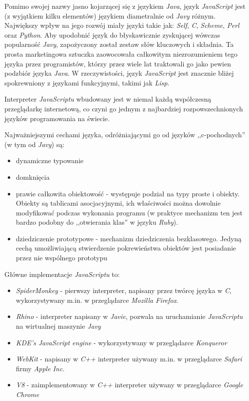\documentclass[a4paper,12pt]{article}
\begin{document}
Pomimo swojej nazwy jasno kojarzącej się z językiem \emph{Java}, język
\emph{JavaScript} jest (z wyjątkiem kilku elementów) językiem
diametralnie od \emph{Javy} różnym. Największy wpływ na jego rozwój
miały języki takie jak: \emph{Self}, \emph{C}, \emph{Scheme},
\emph{Perl} oraz \emph{Python}. Aby upodobnić język do błyskawicznie
zyskującej wówczas popularność \emph{Javy}, zapożyczony został zestaw
słów kluczowych i składnia. Ta prosta marketingowa sztuczka
zaowocowała całkowitym niezrozumieniem tego języka przez programistów,
którzy przez wiele lat traktowali go jako pewien podzbiór języka
\emph{Java}. W rzeczywistości, język \emph{JavaScript} jest znacznie
bliżej spokrewniony z językami funkcyjnymi, takimi jak \emph{Lisp}.

Interpreter \emph{JavaScriptu} wbudowany jest w niemal każdą
współczesną przeglądarkę internetową, co czyni go jednym z najbardziej
rozpowszechnionych języków programowania na świecie.

Najważniejszymi cechami języka, odróżniającymi go od języków
,,c-pochodnych'' (w tym od \emph{Javy}) są:

\begin{itemize}
\item dynamiczne typowanie
\item domknięcia
\item prawie całkowita obiektowość - występuje podział na typy proste
  i obiekty. Obiekty są tablicami asocjacyjnymi, ich właściwości można
  dowolnie modyfikować podczas wykonania programu (w praktyce
  mechanizm ten jest bardzo podobny do ,,otwierania klas'' w języku
  \emph{Ruby}).
\item dziedziczenie prototypowe - mechanizm dziedziczenia
  bezklasowego. Jedyną cechą umożliwiającą stwierdzenie pokrewieństwa
  obiektów jest posiadanie przez nie wspólnego prototypu
\end{itemize}

Główne implementacje \emph{JavaScriptu} to:

\begin{itemize}
\item \emph{SpiderMonkey} - pierwszy interpreter, napisany przez
  twórcę języka w \emph{C}, wykorzystywany m.in. w przeglądarce \emph{Mozilla
    Firefox}.
\item \emph{Rhino} - interpreter napisany w \emph{Javie}, pozwala na
  uruchamianie \emph{JavaScriptu} na wirtualnej maszynie \emph{Javy}
\item \emph{KDE's JavaScript engine} - wykorzystywany w przeglądarce
  \emph{Konqueror}
\item \emph{WebKit} - napisany w \emph{C++} interpreter używany
  m.in. w przeglądarce \emph{Safari} firmy \emph{Apple Inc.}
\item \emph{V8} - zaimplementowany w \emph{C++} interpreter używany w
  przeglądarce \emph{Google Chrome}
\end{itemize}
\end{document}
